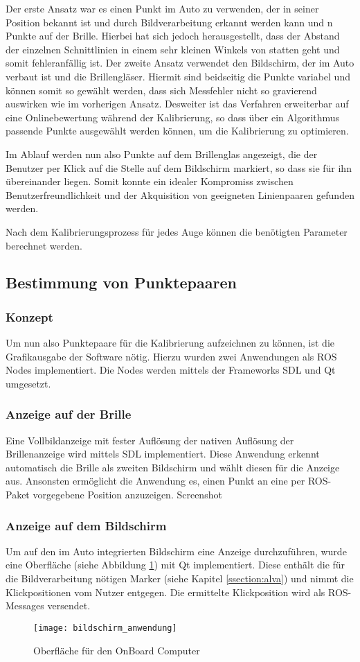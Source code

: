 Der erste Ansatz war es einen Punkt im Auto zu verwenden, der in seiner Position bekannt ist und durch Bildverarbeitung erkannt werden kann und n Punkte auf der Brille. Hierbei hat sich jedoch herausgestellt, dass der Abstand der einzelnen Schnittlinien in einem sehr kleinen Winkels von statten geht und somit fehleranfällig ist. Der zweite Ansatz verwendet den Bildschirm, der im Auto verbaut ist und die Brillengläser. Hiermit sind beidseitig die Punkte variabel und können somit so gewählt werden, dass sich Messfehler nicht so gravierend auswirken wie im vorherigen Ansatz. Desweiter ist das Verfahren erweiterbar auf eine Onlinebewertung während der Kalibrierung, so dass über ein Algorithmus passende Punkte ausgewählt werden können, um die Kalibrierung zu optimieren.

Im Ablauf werden nun also Punkte auf dem Brillenglas angezeigt, die der Benutzer per Klick auf die Stelle auf dem Bildschirm markiert, so dass sie für ihn übereinander liegen. Somit konnte ein idealer Kompromiss zwischen Benutzerfreundlichkeit und der Akquisition von geeigneten Linienpaaren gefunden werden.

Nach dem Kalibrierungsprozess für jedes Auge können die benötigten Parameter berechnet werden.


\subsection{Bestimmung von Punktepaaren}
\label{chap:punktepaare}
\subsubsection{Konzept}
Um nun also Punktepaare für die Kalibrierung aufzeichnen zu können, ist die Grafikausgabe der Software nötig. Hierzu wurden zwei Anwendungen als ROS Nodes implementiert. Die Nodes werden mittels der Frameworks SDL und Qt umgesetzt.
\subsubsection{Anzeige auf der Brille}
Eine Vollbildanzeige mit fester Auflösung der nativen Auflösung der Brillenanzeige wird mittels SDL implementiert. Diese Anwendung erkennt automatisch die Brille als zweiten Bildschirm und wählt diesen für die Anzeige aus. Ansonsten ermöglicht die Anwendung es, einen Punkt an eine per ROS-Paket vorgegebene Position anzuzeigen.
Screenshot
\subsubsection{Anzeige auf dem Bildschirm}
Um auf den im Auto integrierten Bildschirm eine Anzeige durchzuführen, wurde eine Oberfläche (siehe Abbildung \ref{fig:fensteranwendung}) mit Qt implementiert. Diese enthält die für die Bildverarbeitung nötigen Marker (siehe Kapitel \ref{ssection:alva}) und nimmt die Klickpositionen vom Nutzer entgegen. Die ermittelte Klickposition wird als ROS-Messages versendet.
\begin{figure}[h]
   \centering
   \texttt{[image: bildschirm\_anwendung]}
   \caption{Oberfläche für den OnBoard Computer}
   \label{fig:fensteranwendung}
\end{figure}


